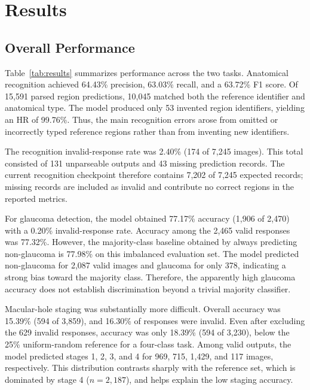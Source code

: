 \section{Results}
\label{sec:results}

\subsection{Overall Performance}

Table~\ref{tab:results} summarizes performance across the two tasks.
Anatomical recognition achieved 64.43\% precision, 63.03\% recall, and a
63.72\% F1 score.  Of 15,591 parsed region predictions, 10,045 matched both
the reference identifier and anatomical type.  The model produced only 53
invented region identifiers, yielding an HR of 99.76\%.  Thus, the main
recognition errors arose from omitted or incorrectly typed reference regions
rather than from inventing new identifiers.

The recognition invalid-response rate was 2.40\% (174 of 7,245 images).  This
total consisted of 131 unparseable outputs and 43 missing prediction records.
The current recognition checkpoint therefore contains 7,202 of 7,245 expected
records; missing records are included as invalid and contribute no correct
regions in the reported metrics.

For glaucoma detection, the model obtained 77.17\% accuracy (1,906 of 2,470)
with a 0.20\% invalid-response rate.  Accuracy among the 2,465 valid responses
was 77.32\%.  However, the majority-class baseline obtained by always
predicting non-glaucoma is 77.98\% on this imbalanced evaluation set.  The
model predicted non-glaucoma for 2,087 valid images and glaucoma for only 378,
indicating a strong bias toward the majority class.  Therefore, the apparently
high glaucoma accuracy does not establish discrimination beyond a trivial
majority classifier.

Macular-hole staging was substantially more difficult.  Overall accuracy was
15.39\% (594 of 3,859), and 16.30\% of responses were invalid.  Even after
excluding the 629 invalid responses, accuracy was only 18.39\% (594 of 3,230),
below the 25\% uniform-random reference for a four-class task.  Among valid
outputs, the model predicted stages 1, 2, 3, and 4 for 969, 715, 1,429, and
117 images, respectively.  This distribution contrasts sharply with the
reference set, which is dominated by stage 4 ($n=2{,}187$), and helps explain
the low staging accuracy.

